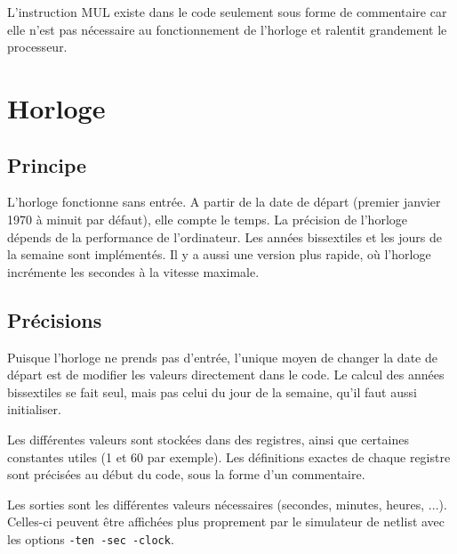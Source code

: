 \documentclass{article}
\begin{document}
L'instruction MUL existe dans le code seulement sous forme de commentaire car elle n'est pas nécessaire au fonctionnement de l'horloge et ralentit grandement le processeur.

\section*{Horloge}

\subsection*{Principe}
L'horloge fonctionne sans entrée. A partir de la date de départ (premier janvier 1970 à minuit par défaut), elle compte le temps. La précision de l'horloge dépends de la performance de l'ordinateur. Les années bissextiles et les jours de la semaine sont implémentés. Il y a aussi une version plus rapide, où l'horloge incrémente les secondes à la vitesse maximale.

\subsection*{Précisions}
Puisque l'horloge ne prends pas d'entrée, l'unique moyen de changer la date de départ est de modifier les valeurs directement dans le code. Le calcul des années bissextiles se fait seul, mais pas celui du jour de la semaine, qu'il faut aussi initialiser.

Les différentes valeurs sont stockées dans des registres, ainsi que certaines constantes utiles (1 et 60 par exemple). Les définitions exactes de chaque registre sont précisées au début du code, sous la forme d'un commentaire.

Les sorties sont les différentes valeurs nécessaires (secondes, minutes, heures, ...). Celles-ci peuvent être affichées plus proprement par le simulateur de netlist avec les options \verb|-ten -sec -clock|.
\end{document}
